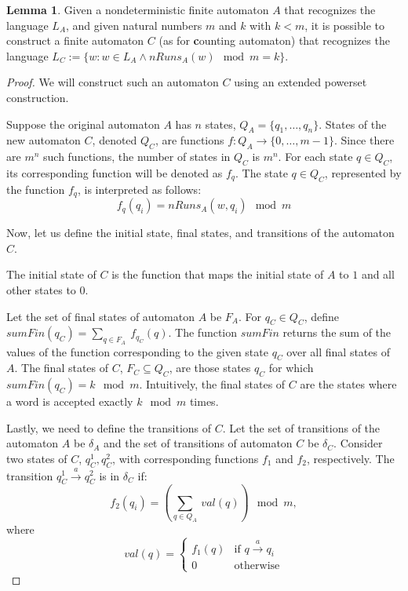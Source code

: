 \documentclass[12pt]{article}
\theoremstyle{definition}
\newtheorem{lemma}[theorem]{Lemma}
\begin{document}
\begin{lemma}
    \label{CountRunsAutomaton}
    Given a nondeterministic finite automaton $A$ that recognizes the language $L_A$, and given natural numbers $m$ and $k$ with $k < m$, it is possible to construct a finite automaton $C$ (as for \textbf{c}ounting automaton) that recognizes the language $L_{C} := \{ w : w \in L_A \land nRuns_A(w) \mod m = k \}$.
\end{lemma}

\begin{proof}
    We will construct such an automaton $C$ using an extended powerset construction.

    Suppose the original automaton $A$ has $n$ states, $Q_A = \{q_1, \ldots, q_n\}$. States of the new automaton $C$, denoted $Q_C$, are functions $f: Q_A \rightarrow \{0, \ldots, m-1 \}$. Since there are $m^n$ such functions, the number of states in $Q_C$ is $m^n$. For each state $q \in Q_C$, its corresponding function will be denoted as $f_q$. The state $q \in Q_C$, represented by the function $f_q$, is interpreted as follows:
    $$f_q(q_i) = nRuns_A(w, q_i) \mod m$$

    Now, let us define the initial state, final states, and transitions of the automaton $C$.

    The initial state of $C$ is the function that maps the initial state of $A$ to $1$ and all other states to $0$.

    Let the set of final states of automaton $A$ be $F_A$. For $q_C \in Q_C$, define $sumFin(q_C) = \sum_{q \in F_A} \ f_{q_C}(q)$. The function $sumFin$ returns the sum of the values of the function corresponding to the given state $q_C$ over all final states of $A$. The final states of $C$, $F_C \subseteq Q_C$, are those states $q_C$ for which $sumFin(q_C) = k \mod m$. Intuitively, the final states of $C$ are the states where a word is accepted exactly $k \mod m$ times.

    Lastly, we need to define the transitions of $C$. Let the set of transitions of the automaton $A$ be $\delta_A$ and the set of transitions of automaton $C$ be $\delta_C$. Consider two states of $C$, $q_C^1, q_C^2$, with corresponding functions $f_1$ and $f_2$, respectively. The transition $q_C^1 \xrightarrow{a} q_C^2$ is in $\delta_C$ if:
    $$f_2(q_i) = (\sum_{q \in Q_A} \ val(q)) \mod m,$$
    where
    \begin{equation*}
        val(q) =
            \begin{cases}
            f_1(q) & \text{if $q \xrightarrow{a} q_i$} \\
            0 & \text{otherwise}
            \end{cases}       
    \end{equation*}


\end{proof}
\end{document}
